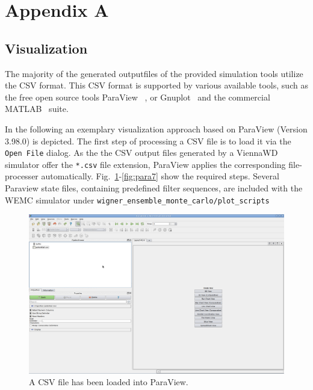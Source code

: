 

\chapter*{Appendix A}   \label{vis}
\section*{Visualization}
The majority of the generated outputfiles of the provided simulation tools utilize
the CSV format.
This CSV format is supported by various available tools, such as
the free open source tools ParaView ~\cite{paraview}, or Gnuplot~\cite{gnuplot} and the commercial MATLAB~\cite{matlab} suite.

In the following an exemplary visualization approach based on ParaView (Version 3.98.0) is depicted.
The first step of processing a CSV file is to load it via the \texttt{Open File} dialog.
As the the CSV output files generated by a ViennaWD simulator offer the \texttt{*.csv} file extension,
ParaView applies the corresponding file-processer automatically.
Fig.~\ref{fig:para1}-\ref{fig:para7} show the required steps. Several Paraview state files, containing predefined filter sequences, are included with the WEMC simulator under \texttt{wigner\_ensemble\_monte\_carlo/plot\_scripts} 

\begin{figure}[!ht]
\includegraphics[width=1.0\columnwidth]{figures/para1.eps}
\caption{A CSV file has been loaded into ParaView.}
\label{fig:para1}
\end{figure}


